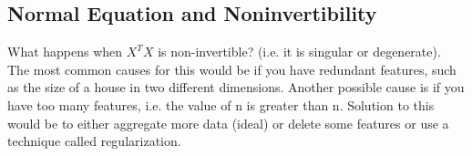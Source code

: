 \subsection{Normal Equation and Noninvertibility}

What happens when $X^TX$ is non-invertible? (i.e. it is singular or degenerate). The most common causes for this would be if you have redundant features, such as the size of a house in two different dimensions. Another possible cause is if you have too many features, i.e. the value of n is greater than n. Solution to this would be to either aggregate more data (ideal) or delete some features or use a technique called regularization. 